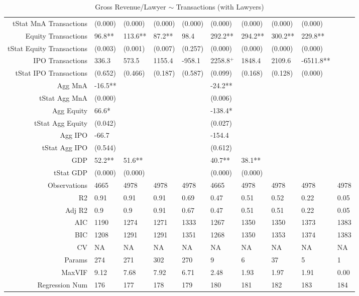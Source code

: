 \begin{table}[ht]
\begin{tabular}{rlllllllll}
  tStat MnA Transactions & (0.000) & (0.000) & (0.000) & (0.000) & (0.000) & (0.000) & (0.000) & (0.000) &  \\ 
  Equity Transactions & 96.8** & 113.6** & 87.2** & 98.4 & 292.2** & 294.2** & 300.2** & 229.8** &  \\ 
  tStat Equity Transactions & (0.003) & (0.001) & (0.007) & (0.257) & (0.000) & (0.000) & (0.000) & (0.000) &  \\ 
  IPO Transactions & 336.3 & 573.5 & 1155.4 & -958.1 & 2258.8$^{+}$ & 1848.4 & 2109.6 & -6511.8** &  \\ 
  tStat IPO Transactions & (0.652) & (0.466) & (0.187) & (0.587) & (0.099) & (0.168) & (0.128) & (0.000) &  \\ 
  Agg MnA & -16.5** &  &  &  & -24.2** &  &  &  &  \\ 
  tStat Agg MnA & (0.000) &  &  &  & (0.006) &  &  &  &  \\ 
  Agg Equity & 66.6* &  &  &  & -138.4* &  &  &  &  \\ 
  tStat Agg Equity & (0.042) &  &  &  & (0.027) &  &  &  &  \\ 
  Agg IPO & -66.7 &  &  &  & -154.4 &  &  &  &  \\ 
  tStat Agg IPO & (0.544) &  &  &  & (0.612) &  &  &  &  \\ 
  GDP & 52.2** & 51.6** &  &  & 40.7** & 38.1** &  &  &  \\ 
  tStat GDP & (0.000) & (0.000) &  &  & (0.000) & (0.000) &  &  &  \\ 
  Observations & 4665 & 4978 & 4978 & 4978 & 4665 & 4978 & 4978 & 4978 & 4978 \\ 
  R2 & 0.91 & 0.91 & 0.91 & 0.69 & 0.47 & 0.51 & 0.52 & 0.22 & 0.05 \\ 
  Adj R2 & 0.9 & 0.9 & 0.91 & 0.67 & 0.47 & 0.51 & 0.51 & 0.22 & 0.05 \\ 
  AIC & 1190 & 1274 & 1271 & 1333 & 1267 & 1350 & 1350 & 1373 & 1383 \\ 
  BIC & 1208 & 1291 & 1291 & 1351 & 1268 & 1350 & 1353 & 1374 & 1383 \\ 
  CV & NA & NA & NA & NA & NA & NA & NA & NA & NA \\ 
  Params & 274 & 271 & 302 & 270 & 9 & 6 & 37 & 5 & 1 \\ 
  MaxVIF & 9.12 & 7.68 & 7.92 & 6.71 & 2.48 & 1.93 & 1.97 & 1.91 & 0.00 \\ 
  Regression Num & 176 & 177 & 178 & 179 & 180 & 181 & 182 & 183 & 184 \\ 
   \hline
\end{tabular}
\caption{Gross Revenue/Lawyer $\sim$ Transactions (with Lawyers)} 
\end{table}
